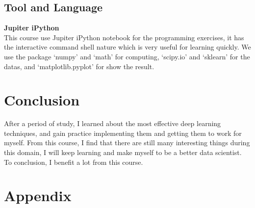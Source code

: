 \documentclass[a4paper]{article}
\begin{document}
\subsection{Tool and Language}
\textbf{Jupiter iPython}\\
This course use Jupiter iPython notebook for the programming exercises, it has the interactive command shell nature which is very useful for learning quickly. We use the package `numpy' and `math' for computing, `scipy.io' and `sklearn' for the datas, and `matplotlib.pyplot' for show the result.

\newpage
\section{Conclusion}
After a period of study, I learned about the most effective deep learning techniques, and gain practice implementing them and getting them to work for myself. From this course, I find that there are still many interesting things during this domain, I will keep learning and make myself to be a better data scientist. To conclusion, I benefit a lot from this course.

\section{Appendix}
\end{document}
